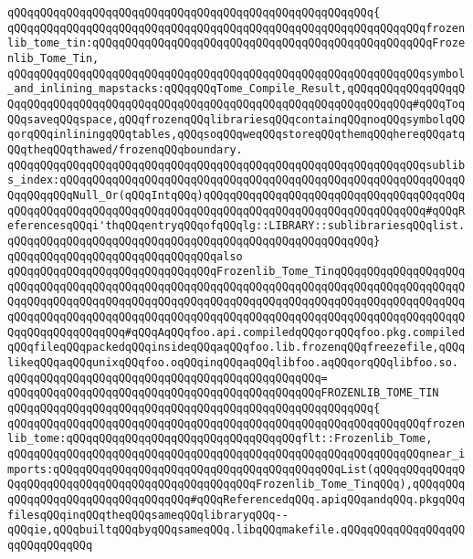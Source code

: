 \verb|qQQqqQQqqQQqqQQqqQQqqQQqqQQqqQQqqQQqqQQqqQQqqQQqqQQqqQQq{|\newline
\verb|qQQqqQQqqQQqqQQqqQQqqQQqqQQqqQQqqQQqqQQqqQQqqQQqqQQqqQQqqQQqqQQqfrozenlib_tome_tin:qQQqqQQqqQQqqQQqqQQqqQQqqQQqqQQqqQQqqQQqqQQqqQQqqQQqFrozenlib_Tome_Tin,|\newline
\verb|qQQqqQQqqQQqqQQqqQQqqQQqqQQqqQQqqQQqqQQqqQQqqQQqqQQqqQQqqQQqqQQqsymbol_and_inlining_mapstacks:qQQqqQQqTome_Compile_Result,qQQqqQQqqQQqqQQqqQQqqQQqqQQqqQQqqQQqqQQqqQQqqQQqqQQqqQQqqQQqqQQqqQQqqQQqqQQqqQQq#qQQqToqQQqsaveqQQqspace,qQQqfrozenqQQqlibrariesqQQqcontainqQQqnoqQQqsymbolqQQqorqQQqinliningqQQqtables,qQQqsoqQQqweqQQqstoreqQQqthemqQQqhereqQQqatqQQqtheqQQqthawed/frozenqQQqboundary.|\newline
\verb|qQQqqQQqqQQqqQQqqQQqqQQqqQQqqQQqqQQqqQQqqQQqqQQqqQQqqQQqqQQqqQQqsublibs_index:qQQqqQQqqQQqqQQqqQQqqQQqqQQqqQQqqQQqqQQqqQQqqQQqqQQqqQQqqQQqqQQqqQQqqQQqNull_Or(qQQqIntqQQq)qQQqqQQqqQQqqQQqqQQqqQQqqQQqqQQqqQQqqQQqqQQqqQQqqQQqqQQqqQQqqQQqqQQqqQQqqQQqqQQqqQQqqQQqqQQqqQQqqQQqqQQq#qQQqReferencesqQQqi'thqQQqentryqQQqofqQQqlg::LIBRARY::sublibrariesqQQqlist.|\newline
\verb|qQQqqQQqqQQqqQQqqQQqqQQqqQQqqQQqqQQqqQQqqQQqqQQqqQQqqQQq}|\newline
\newline
\verb|qQQqqQQqqQQqqQQqqQQqqQQqqQQqqQQqalso|\newline
\verb|qQQqqQQqqQQqqQQqqQQqqQQqqQQqqQQqFrozenlib_Tome_TinqQQqqQQqqQQqqQQqqQQqqQQqqQQqqQQqqQQqqQQqqQQqqQQqqQQqqQQqqQQqqQQqqQQqqQQqqQQqqQQqqQQqqQQqqQQqqQQqqQQqqQQqqQQqqQQqqQQqqQQqqQQqqQQqqQQqqQQqqQQqqQQqqQQqqQQqqQQqqQQqqQQqqQQqqQQqqQQqqQQqqQQqqQQqqQQqqQQqqQQqqQQqqQQqqQQqqQQqqQQqqQQqqQQqqQQqqQQqqQQqqQQqqQQq#qQQqAqQQqfoo.api.compiledqQQqorqQQqfoo.pkg.compiledqQQqfileqQQqpackedqQQqinsideqQQqaqQQqfoo.lib.frozenqQQqfreezefile,qQQqlikeqQQqaqQQqunixqQQqfoo.oqQQqinqQQqaqQQqlibfoo.aqQQqorqQQqlibfoo.so.|\newline
\verb|qQQqqQQqqQQqqQQqqQQqqQQqqQQqqQQqqQQqqQQqqQQqqQQq=|\newline
\verb|qQQqqQQqqQQqqQQqqQQqqQQqqQQqqQQqqQQqqQQqqQQqqQQqFROZENLIB_TOME_TIN|\newline
\verb|qQQqqQQqqQQqqQQqqQQqqQQqqQQqqQQqqQQqqQQqqQQqqQQqqQQqqQQq{|\newline
\verb|qQQqqQQqqQQqqQQqqQQqqQQqqQQqqQQqqQQqqQQqqQQqqQQqqQQqqQQqqQQqqQQqfrozenlib_tome:qQQqqQQqqQQqqQQqqQQqqQQqqQQqqQQqqQQqflt::Frozenlib_Tome,|\newline
\verb|qQQqqQQqqQQqqQQqqQQqqQQqqQQqqQQqqQQqqQQqqQQqqQQqqQQqqQQqqQQqqQQqnear_imports:qQQqqQQqqQQqqQQqqQQqqQQqqQQqqQQqqQQqqQQqqQQqList(qQQqqQQqqQQqqQQqqQQqqQQqqQQqqQQqqQQqqQQqqQQqqQQqqQQqFrozenlib_Tome_TinqQQq),qQQqqQQqqQQqqQQqqQQqqQQqqQQqqQQqqQQq#qQQqReferencedqQQq.apiqQQqandqQQq.pkgqQQqfilesqQQqinqQQqtheqQQqsameqQQqlibraryqQQq--qQQqie,qQQqbuiltqQQqbyqQQqsameqQQq.libqQQqmakefile.qQQqqQQqqQQqqQQqqQQqqQQqqQQqqQQq|\newline
